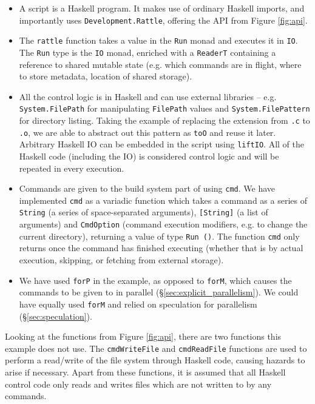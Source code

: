 \begin{itemize}
\item A \Rattle script is a Haskell program. It makes use of ordinary Haskell imports, and importantly uses \texttt{Development.Rattle}, offering the API from Figure \ref{fig:api}.
\item The \texttt{rattle} function takes a value in the \texttt{Run} monad and executes it in \texttt{IO}. The \texttt{Run} type is the \texttt{IO} monad, enriched with a \texttt{ReaderT} \cite{mtl} containing a reference to shared mutable state (e.g. which commands are in flight, where to store metadata, location of shared storage).
\item All the control logic is in Haskell and can use external libraries -- e.g. \texttt{System.FilePath} for manipulating \texttt{FilePath} values and \texttt{System.FilePattern} for directory listing. Taking the example of replacing the extension from \texttt{.c} to \texttt{.o}, we are able to abstract out this pattern as \texttt{toO} and reuse it later. Arbitrary Haskell IO can be embedded in the script using \texttt{liftIO}. All of the Haskell code (including the IO) is considered control logic and will be repeated in every execution.
\item Commands are given to the build system part of \Rattle using \texttt{cmd}. We have implemented \texttt{cmd} as a variadic function \cite{variadic_functions} which takes a command as a series of \texttt{String} (a series of space-separated arguments), \texttt{[String]} (a list of arguments) and \texttt{CmdOption} (command execution modifiers, e.g. to change the current directory), returning a value of type \texttt{Run ()}. The function \texttt{cmd} only returns once the command has finished executing (whether that is by actual execution, skipping, or fetching from external storage).
\item We have used \texttt{forP} in the example, as opposed to \texttt{forM}, which causes the commands to be given to \Rattle in parallel (\S\ref{sec:explicit_parallelism}). We could have equally used \texttt{forM} and relied on speculation for parallelism (\S\ref{sec:speculation}).
\end{itemize}

Looking at the functions from Figure \ref{fig:api}, there are two functions this example does not use. The \texttt{cmdWriteFile} and \texttt{cmdReadFile} functions are used to perform a read/write of the file system through Haskell code, causing hazards to arise if necessary. Apart from these functions, it is assumed that all Haskell control code only reads and writes files which are not written to by any commands.

